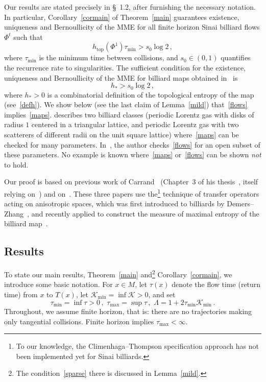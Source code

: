 \documentclass[10pt]{amsart}
\theoremstyle{definition}\newtheorem{defi}[theo]{Definition}\newtheorem{rema}[theo]{Remark}\newtheorem{exam}[theo]{Example}\newtheorem{exem}[theo]{Example}\newtheorem{nota}[theo]{Notation}
\newcommand{\cK}{\mathcal{K}}
\newcommand{\htop}{h_{\scriptstyle{\text{top}}}}
\begin{document}
Our results are stated precisely in \S~1.2, after furnishing the necessary notation. In particular, Corollary~\ref{cormain} of Theorem~\ref{main} guarantees existence, uniqueness and Bernoullicity of the MME for all finite horizon Sinai billiard flows $\Phi^t$ such that
\begin{equation}\label{flows}
\htop\left(\Phi^1\right) \tau_{\min} > s_0 \log 2\,,
\end{equation}
where $\tau_{\min}$ is the minimum time between collisions, and $s_0\in (0,1)$ quantifies the recurrence rate to singularities. The sufficient condition for the existence, uniqueness and Bernoullicity of the MME for billiard maps obtained in~\cite{BD1} is
\begin{equation}\label{maps}
h_* > s_0 \log2\,,
\end{equation}
where $h_*>0$ is a combinatorial definition of the topological entropy of the map (see~\eqref{defh}). We show below (see the last claim of Lemma~\ref{mild}) that~\eqref{flows} implies~\eqref{maps}. \cite[Section~2.4]{BD1} describes two billiard classes (periodic Lorentz gas with disks of radius $1$ centered in a triangular lattice, and periodic Lorentz gas with two scatterers of different radii on the unit square lattice) where~\eqref{maps} can be checked for many parameters. In~\cite[Remark~5.6]{Ca}, the author checks~\eqref{flows} for an open subset of these parameters. No example is known where~\eqref{maps} or~\eqref{flows} can be shown \emph{not} to hold.


Our proof is based on previous work of Carrand~\cite{Ca} (Chapter~3 of his thesis~\cite{Ca0}, itself relying on~\cite{BD1}) and on~\cite{BD2}. These three papers use the\footnote{To our knowledge, the Climenhaga--Thompson specification approach has not been implemented yet for Sinai billiards.} technique of transfer operators acting on anisotropic spaces, which was first introduced to billiards by Demers--Zhang~\cite{DZ1}, and recently applied to construct the measure of maximal entropy of the billiard map~\cite{BD1}.



\subsection{Results}

To state our main results, Theorem~\ref{main} and\footnote{The condition~\eqref{sparse} there is discussed in Lemma~\ref{mild}.} Corollary~\ref{cormain}, we introduce some basic notation. For $x \in M$, let $\tau(x)$ denote the flow time (return time) from $x$ to $T(x)$, let $\cK_{\min}=\inf \cK>0$, and set
\[
\tau_{\min}=\inf \tau>0\,, \,\, \tau_{\max}=\sup \tau\,,\,\,
\Lambda = 1 + 2 \tau_{\min} \cK_{\min}\,.
\]
Throughout, we assume finite horizon, that is: there are no trajectories making only tangential collisions. Finite horizon implies $\tau_{\max}<\infty$.
\end{document}

